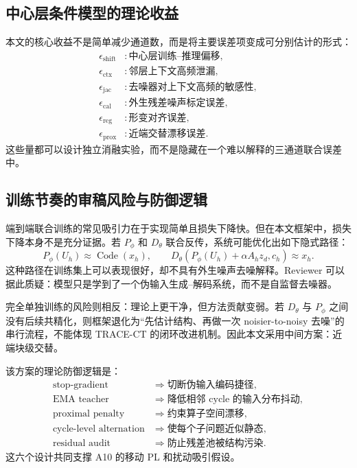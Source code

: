 \documentclass[11pt,a4paper,UTF8,fontset=fandol]{ctexart}
\theoremstyle{definition}
\begin{document}
\subsection{中心层条件模型的理论收益}

本文的核心收益不是简单减少通道数，而是将主要误差项变成可分别估计的形式：
\begin{equation}
\begin{aligned}
    \epsilon_{\mathrm{shift}} &: \text{中心层训练--推理偏移},\\
    \epsilon_{\mathrm{ctx}} &: \text{邻层上下文高频泄漏},\\
    \epsilon_{\mathrm{jac}} &: \text{去噪器对上下文高频的敏感性},\\
    \epsilon_{\mathrm{cal}} &: \text{外生残差噪声标定误差},\\
    \epsilon_{\mathrm{reg}} &: \text{形变对齐误差},\\
    \epsilon_{\mathrm{prox}} &: \text{近端交替漂移误差}.
\end{aligned}
\end{equation}
这些量都可以设计独立消融实验，而不是隐藏在一个难以解释的三通道联合误差中。

\subsection{训练节奏的审稿风险与防御逻辑}

端到端联合训练的常见吸引力在于实现简单且损失下降快。但在本文框架中，损失下降本身不是充分证据。若 $P_\phi$ 和 $D_\theta$ 联合反传，系统可能优化出如下隐式路径：
\begin{equation}
    P_\phi(U_h) \approx \operatorname{Code}(x_h),
    \qquad
    D_\theta(P_\phi(U_h)+\alpha A_hz_d,c_h)\approx x_h.
\end{equation}
这种路径在训练集上可以表现很好，却不具有外生噪声去噪解释。Reviewer 可以据此质疑：模型只是学到了一个伪输入生成--解码系统，而不是自监督去噪器。

完全单独训练的风险则相反：理论上更干净，但方法贡献变弱。若 $D_\theta$ 与 $P_\phi$ 之间没有后续共精化，则框架退化为“先估计结构、再做一次 noisier-to-noisy 去噪”的串行流程，不能体现 TRACE-CT 的闭环改进机制。因此本文采用中间方案：近端块级交替。

该方案的理论防御逻辑是：
\begin{equation}
\begin{aligned}
    \text{stop-gradient} &\Rightarrow \text{切断伪输入编码捷径},\\
    \text{EMA teacher} &\Rightarrow \text{降低相邻 cycle 的输入分布抖动},\\
    \text{proximal penalty} &\Rightarrow \text{约束算子空间漂移},\\
    \text{cycle-level alternation} &\Rightarrow \text{使每个子问题近似静态},\\
    \text{residual audit} &\Rightarrow \text{防止残差池被结构污染}.
\end{aligned}
\end{equation}
这六个设计共同支撑 A10 的移动 PL 和扰动吸引假设。
\end{document}
